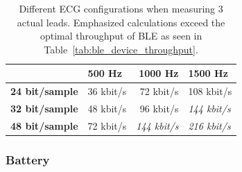 \begin{table}[]
\centering
\captionsetup{justification=centering}
\caption{Different ECG configurations when measuring 3 actual leads. Emphasized calculations exceed the optimal throughput of BLE as seen in Table~\ref{tab:ble_device_throughput}.}
\label{tab:ecg_sampling_rate}
\begin{tabular}{@{}llrl@{}}
\toprule
\textbf{} & \textbf{500 Hz} & \textbf{1000 Hz} & \textbf{1500 Hz} \\ \midrule
\textbf{24 bit/sample}         & 36 kbit/s & 72 kbit/s & 108 kbit/s         \\
\textbf{32 bit/sample}         & 48 kbit/s & 96 kbit/s & \color{red}\textit{144 kbit/s}         \\
\textbf{48 bit/sample}         & 72 kbit/s & \color{red}\textit{144 kbit/s}  & \color{red}\textit{216 kbit/s}         \\ \bottomrule
\end{tabular}
\end{table}




\subsubsection{Battery} %
\label{ssub:battery}

